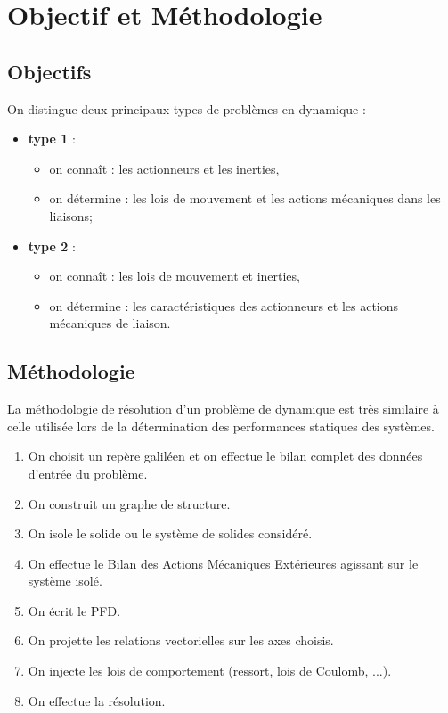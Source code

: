 \documentclass[10pt,fleqn]{article} %
\begin{document}
\section{Objectif et Méthodologie}

\subsection{Objectifs}
On distingue deux principaux types de problèmes en dynamique : 
\begin{itemize}
\item \textbf{type 1} :
\begin{itemize}
\item on connaît : les actionneurs et les inerties,
\item on détermine : les lois de mouvement et les actions mécaniques dans les liaisons;
\end{itemize} 
\item \textbf{type 2} :
\begin{itemize}
\item on connaît : les lois de mouvement et inerties,
\item on détermine : les caractéristiques des actionneurs et les actions mécaniques de liaison.
\end{itemize}
\end{itemize}

\subsection{Méthodologie}
La méthodologie de résolution d'un problème de dynamique est très similaire à celle utilisée lors de la détermination des performances statiques des systèmes.

\begin{enumerate}
\item On choisit un repère galiléen et on effectue le bilan complet des données d'entrée du problème.
\item On construit un graphe de structure.
\item On isole le solide ou le système de solides considéré.
\item On effectue le Bilan des Actions Mécaniques Extérieures agissant sur le système isolé.
\item On écrit le PFD.
\item On projette les relations vectorielles sur les axes choisis.
\item On injecte les lois de comportement (ressort, lois de Coulomb, ...).
\item On effectue la résolution.
\end{enumerate}
\end{document}
